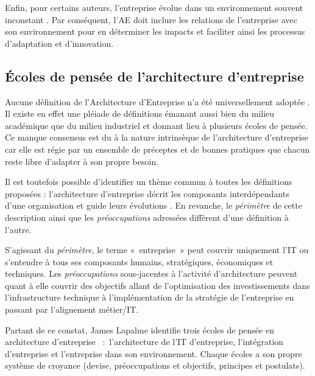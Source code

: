 Enfin, pour certains auteurs, l'entreprise évolue dans un environnement souvent inconstant \cite{lapalme2012three}. Par conséquent, l'AE 
doit inclure les relations de l'entreprise avec son environnement pour en 
déterminer les impacts et faciliter ainsi les processus d'adaptation  et 
d'innovation.


\subsection{Écoles de pensée de l'architecture d'entreprise} 

Aucune définition de l'Architecture d'Entreprise n'a été universellement adoptée \cite{mentz2012comparison} \cite{ranganathan2005enterprise}. Il existe en effet une pléiade de définitions émanant aussi bien du milieu académique que du milieu industriel et donnant lieu à plusieurs écoles de pensée. Ce manque consensus est du à la nature intrinsèque de l'architecture d'entreprise car elle est régie par un ensemble de préceptes et de bonnes pratiques que chacun reste libre d'adapter à son propre besoin. 

Il est toutefois possible d'identifier un thème commun à toutes les définitions 
proposées : l'architecture d'entreprise décrit les composants interdépendants 
d'une organisation et guide leurs évolutions \cite{lapalme2012three}. En 
revanche, le \textit{périmètre} de cette description ainsi que les \textit{préoccupations} 
adressées diffèrent d'une définition à l'autre.

S'agissant du \textit{périmètre}, le terme «~entreprise~» peut couvrir uniquement l'IT  ou s'entendre à tous ses composants humains, stratégiques, économiques et techniques. Les \textit{préoccupations} sous-jacentes à l'activité d'architecture peuvent quant à elle couvrir des objectifs allant de l'optimisation des investissements dans l'infrastructure technique à l'implémentation de la stratégie de l'entreprise en passant par l'alignement métier/IT. 

Partant de ce constat, James Lapalme identifie trois écoles de pensée en architecture d'entreprise \cite{lapalme2012three}~:~l'architecture de l'IT d'entreprise, l'intégration 
d'entreprise et l'entreprise dans son environnement. Chaque écoles a son 
propre système de croyance (devise, préoccupations et objectifs, principes et 
postulats).



